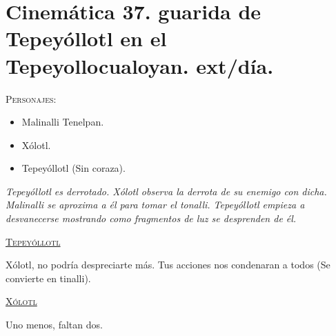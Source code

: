 \section{Cinemática 37. guarida de Tepeyóllotl en el Tepeyollocualoyan. ext/día. } \label{Cin:Cinematica37}
 \textsc{Personajes}:
 \begin{itemize}
 \item Malinalli Tenelpan.
 \item Xólotl.
 \item Tepeyóllotl (Sin coraza).
 \end{itemize}
\textit{Tepeyóllotl es derrotado. Xólotl observa la derrota de su enemigo con dicha. Malinalli se aproxima a él para tomar el tonalli. Tepeyóllotl empieza a desvanecerse mostrando como fragmentos de luz se desprenden de él.}
\begin{center}
\textsc{\underline{Tepeyóllotl}}
\\
\par
Xólotl, no podría despreciarte más. Tus acciones nos condenaran a todos (Se convierte en tinalli).
\\
\par
\textsc{\underline{Xólotl}}
\\
\par
Uno menos, faltan dos. 
\end{center}
 